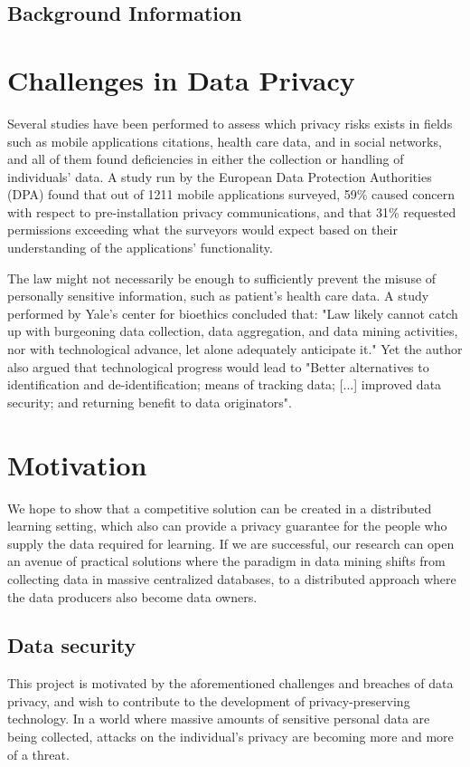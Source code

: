 \subsection{Background Information}	


\section{Challenges in Data Privacy}

Several studies have been performed to assess which privacy risks exists in fields such as mobile applications {citations}, health care data, and in social networks, and all of them found deficiencies in either the collection or handling of individuals' data. A study run by the European Data Protection Authorities (DPA) found that out of 1211 mobile applications surveyed, 59\% caused concern with respect to pre-installation privacy communications, and that 31\%  requested permissions exceeding what the surveyors would expect based on their understanding of the applications’ functionality\cite{EUprivacySweep2014}. 

The law might not necessarily be enough to sufficiently prevent the misuse of personally sensitive information, such as patient's health care data. A study performed by Yale's center for bioethics concluded that: "Law likely cannot catch up with burgeoning data collection, data aggregation, and data
mining activities, nor with technological advance, let alone adequately anticipate it." Yet the author also argued that technological progress would lead to "Better alternatives to identification and de-identification;  means of tracking data; [...] improved data security; and returning benefit to data originators"\cite{kaplan2014patient}.

\section{Motivation}

We hope to show that a competitive solution can be created in a distributed learning setting, which also can provide a privacy guarantee for the people who supply the data required for learning. If we are successful, our research can open an avenue of practical solutions where the paradigm in data mining shifts from collecting data in massive centralized databases, to a distributed approach where the data producers also become data owners.

\subsection{Data security}
This project is motivated by the aforementioned challenges and breaches of data privacy, and wish to contribute to the development of privacy-preserving technology. In a world where massive amounts of sensitive personal data are being collected, attacks on the individual's privacy are becoming more and more of a threat.

